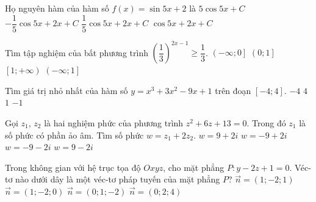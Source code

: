 \begin{ex}%
	Họ nguyên hàm của hàm số $f(x)=\sin{5x}+2$ là
	\choice
	{ $5\cos{5x}+C$}
	{\True $  -\dfrac{1}{5}\cos{5x}+2x+C$}
	{$\dfrac{1}{5}\cos{5x}+2x+C$}
	{ $\cos{5x}+2x+C$}
\end{ex}
\begin{ex}%
	Tìm tập nghiệm của bất phương trình $\left( \dfrac{1}{3} \right) ^{2x-1} \geq \dfrac{1}{3}$.
	\choice
	{ $\left( -\infty;0 \right] $}
	{$\left( 0;1 \right] $}
	{ $\left[ 1;+\infty \right)$}
	{\True $\left( -\infty;1 \right] $}
\end{ex}
\begin{ex}%
	Tìm giá trị nhỏ nhất của hàm số $y=x^3+3x^2-9x+1$ trên đoạn $[-4;4]$.
	\choice
	{\True $-4$}
	{$4$}
	{$1 $}
	{$-1$}
\end{ex}
\begin{ex}%
	Gọi $z_{1}$, $z_{2}$  là hai nghiệm phức của phương trình $z^2+6z+13=0$. Trong đó $z_{1}$ là số phức có phần ảo âm. Tìm số phức $w=z_{1}+2z_{2}$.
	\choice
	{$w=9+2i$}
	{\True $w=-9+2i$}
	{ $w=-9-2i$}
	{$w=9-2i $}
\end{ex}
\begin{ex}%
	Trong không gian với hệ trục tọa độ $Oxyz$, cho mặt phẳng $P \colon y-2z+1=0$. Véc-tơ nào dưới dây là một véc-tơ pháp tuyến của mặt phẳng $P$?
	\choice
	{ $\vec{n}=(1;-2;1)$}
	{$ \vec{n}=(1;-2;0)$}
	{\True $  \vec{n}=(0;1;-2)$}
	{$ \vec{n}=(0;2;4)$}
\end{ex}
